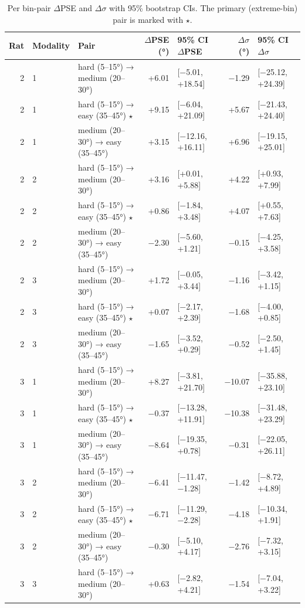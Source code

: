 \begin{table}[htbp]
  \centering
  \caption{Per bin-pair $\Delta$PSE and $\Delta\sigma$ with 95\% bootstrap CIs. The primary (extreme-bin) pair is marked with $\star$.}
  \label{tab:perceptual_bias_details}
  \begin{tabular}{rllrlrl}
    \toprule
    Rat & Modality & Pair & $\Delta$PSE (°) & 95\% CI $\Delta$PSE & $\Delta\sigma$ (°) & 95\% CI $\Delta\sigma$ \\
    \midrule
    2 & 1 & hard (5–15°) → medium (20–30°) & +6.01 & [−5.01, +18.54] & −1.29 & [−25.12, +24.39] \\
    2 & 1 & hard (5–15°) → easy (35–45°) $\star$ & +9.15 & [−6.04, +21.09] & +5.67 & [−21.43, +24.40] \\
    2 & 1 & medium (20–30°) → easy (35–45°) & +3.15 & [−12.16, +16.11] & +6.96 & [−19.15, +25.01] \\
    2 & 2 & hard (5–15°) → medium (20–30°) & +3.16 & [+0.01, +5.88] & +4.22 & [+0.93, +7.99] \\
    2 & 2 & hard (5–15°) → easy (35–45°) $\star$ & +0.86 & [−1.84, +3.48] & +4.07 & [+0.55, +7.63] \\
    2 & 2 & medium (20–30°) → easy (35–45°) & −2.30 & [−5.60, +1.21] & −0.15 & [−4.25, +3.58] \\
    2 & 3 & hard (5–15°) → medium (20–30°) & +1.72 & [−0.05, +3.44] & −1.16 & [−3.42, +1.15] \\
    2 & 3 & hard (5–15°) → easy (35–45°) $\star$ & +0.07 & [−2.17, +2.39] & −1.68 & [−4.00, +0.85] \\
    2 & 3 & medium (20–30°) → easy (35–45°) & −1.65 & [−3.52, +0.29] & −0.52 & [−2.50, +1.45] \\
    3 & 1 & hard (5–15°) → medium (20–30°) & +8.27 & [−3.81, +21.70] & −10.07 & [−35.88, +23.10] \\
    3 & 1 & hard (5–15°) → easy (35–45°) $\star$ & −0.37 & [−13.28, +11.91] & −10.38 & [−31.48, +23.29] \\
    3 & 1 & medium (20–30°) → easy (35–45°) & −8.64 & [−19.35, +0.78] & −0.31 & [−22.05, +26.11] \\
    3 & 2 & hard (5–15°) → medium (20–30°) & −6.41 & [−11.47, −1.28] & −1.42 & [−8.72, +4.89] \\
    3 & 2 & hard (5–15°) → easy (35–45°) $\star$ & −6.71 & [−11.29, −2.28] & −4.18 & [−10.34, +1.91] \\
    3 & 2 & medium (20–30°) → easy (35–45°) & −0.30 & [−5.10, +4.17] & −2.76 & [−7.32, +3.15] \\
    3 & 3 & hard (5–15°) → medium (20–30°) & +0.63 & [−2.82, +4.21] & −1.54 & [−7.04, +3.22] \\

\end{tabular}
\end{table}
